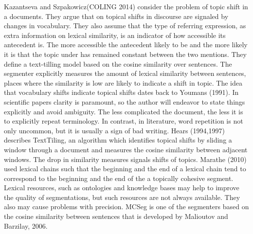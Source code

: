 Kazantseva and Szpakowicz(COLING 2014) consider the problem of topic shift in a documents. 
They argue that on topical shifts in discourse are signaled by changes in vocabulary. 
They also assume that the type of referring expression, as extra information on lexical similarity, is an indicator of how accessible its antecedent is. 
The more accessible the antecedent likely to be and the more likely it is that the topic under has remained constant between the two mentions. 
They define a text-tilling model based on the cosine similarity over sentences. 
The segmenter explicitly measures the amount of lexical similarity between sentences, places where the similarity is low are likely to indicate a shift in topic. 
The idea that vocabulary shifts indicate topical shifts dates back to Youmans (1991). 
In scientific papers clarity is paramount, so the author will endeavor to state things explicitly and avoid ambiguity. 
The less complicated the document, the less it is to explicitly repeat terminology. 
In contrast, in literature, word repetition is not only uncommon, but it is usually a sign of bad writing.  
Hears (1994,1997) describes TextTiling, an algorithm which identifies topical shifts by sliding a window through a document and measures the cosine similarity between adjacent windows. 
The drop in similarity measures signals shifts of topics. 
Marathe (2010) used lexical chains such that the beginning and the end of a lexical chain tend to correspond to the beginning and the end of the a topically cohesive segment.
Lexical resources, such as ontologies and knowledge bases may help to improve the quality of segmentations, but such resources are not always available. 
They also may cause problems with precision. 
MCSeg is one of the segmenters based on the cosine similarity between sentences that is developed by Malioutov and Barzilay, 2006. 


